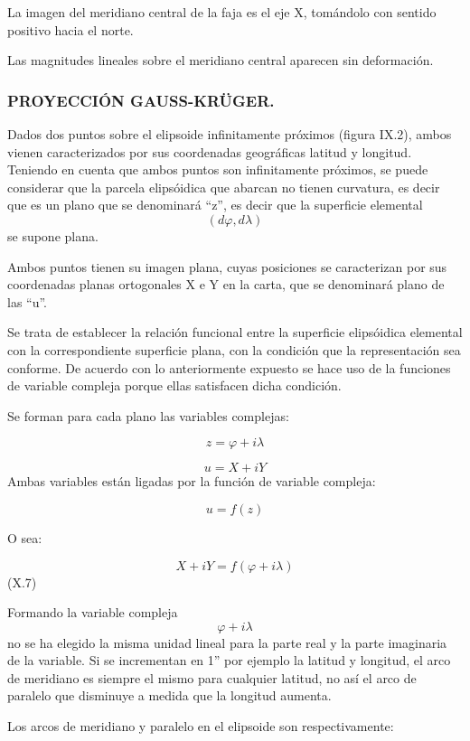 \documentclass[]{article}
\begin{document}
La imagen del meridiano central de la faja es el eje X, tomándolo con
sentido positivo hacia el norte.

Las magnitudes lineales sobre el meridiano central aparecen sin
deformación.

\hypertarget{proyecciuxf3n-gauss-kruxfcger.}{%
\subsubsection{PROYECCIÓN
GAUSS-KRÜGER.}\label{proyecciuxf3n-gauss-kruxfcger.}}

Dados dos puntos sobre el elipsoide infinitamente próximos (figura
IX.2), ambos vienen caracterizados por sus coordenadas geográficas
latitud y longitud. Teniendo en cuenta que ambos puntos son
infinitamente próximos, se puede considerar que la parcela elipsóidica
que abarcan no tienen curvatura, es decir que es un plano que se
denominará ``z'', es decir que la superficie elemental
\[\left(d\varphi,d\lambda \right)\] se supone plana.

Ambos puntos tienen su imagen plana, cuyas posiciones se caracterizan
por sus coordenadas planas ortogonales X e Y en la carta, que se
denominará plano de las ``u''.

Se trata de establecer la relación funcional entre la superficie
elipsóidica elemental con la correspondiente superficie plana, con la
condición que la representación sea conforme. De acuerdo con lo
anteriormente expuesto se hace uso de la funciones de variable compleja
porque ellas satisfacen dicha condición.

Se forman para cada plano las variables complejas:

\[z=\varphi + i \lambda\]

\[u=X+iY\] Ambas variables están ligadas por la función de variable
compleja:

\[u=f\left(z\right)\]

O sea:

\[X+iY=f\left(\varphi +\mathit{i\lambda
}\right)\] (X.7)

Formando la variable compleja \[\varphi +i\lambda \] no se ha elegido la
misma unidad lineal para la parte real y la parte imaginaria de la
variable. Si se incrementan en 1'' por ejemplo la latitud y longitud, el
arco de meridiano es siempre el mismo para cualquier latitud, no así el
arco de paralelo que disminuye a medida que la longitud aumenta.

Los arcos de meridiano y paralelo en el elipsoide son respectivamente:
\end{document}
